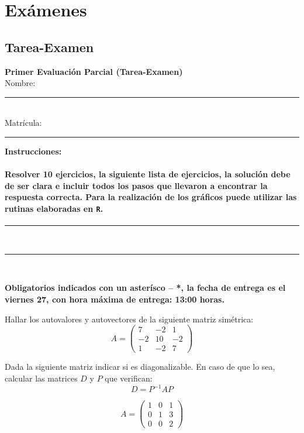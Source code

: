 
\section{Ex\'amenes}


\subsection{Tarea-Examen}

\begin{center}
    {\Large \textbf{Primer Evaluaci\'on Parcial (Tarea-Examen)}} \\[0.3cm]
    Nombre: \rule{10cm}{0.4pt} \\[0.3cm]
    Matrícula: \rule{5cm}{0.4pt}
\end{center}


\textbf{Instrucciones:}

\paragraph{
Resolver 10 ejercicios,  la siguiente lista de ejercicios, la soluci\'on debe de ser clara e incluir todos los pasos que llevaron a encontrar la respuesta correcta. Para la realizaci\'on de los gr\'aficos puede utilizar las rutinas elaboradas en \texttt{R}.}
\begin{center}
\rule{15cm}{0.4pt} \\[0.2cm]
\rule{15cm}{0.4pt} \\[0.2cm]
\end{center}
\textbf{Obligatorios indicados con un aster\'isco -- *, la fecha de entrega es el viernes 27, con hora m\'axima de entrega: 13:00 horas.}

\begin{Quest}

Hallar los autovalores y autovectores de la siguiente matriz simétrica:
\[
A=
\begin{pmatrix}
7 & -2 & 1\\
-2 & 10 & -2\\
1 & -2 & 7
\end{pmatrix}
\]
\end{Quest}

\begin{Quest}
Dada la siguiente matriz indicar si es diagonalizable. En caso de que lo sea, calcular las matrices $D$ y $P$ que verifican:
\[
D = P^{-1} A P
\]

\[
A=
\begin{pmatrix}
1 & 0 & 1\\
0 & 1 & 3\\
0 & 0 & 2
\end{pmatrix}
\]

\end{Quest}

